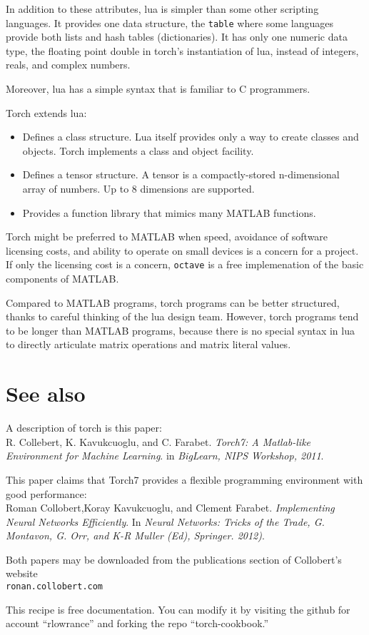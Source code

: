 \documentclass{article}
\let\code\texttt %
\begin{document}
In addition to these attributes, lua is simpler than some other
scripting languages. It provides one data structure, the \code{table}
where some languages provide both lists and hash tables (dictionaries).
It has only one numeric data type, the floating point double in torch's
instantiation of lua, instead of integers, reals, and complex numbers.

Moreover, lua has a simple syntax that is familiar to C programmers.

Torch extends lua:
\begin{itemize}
  \item Defines a class structure. Lua itself provides only a way to
    create classes and objects. Torch implements a class and object
    facility.
  \item Defines a tensor structure. A tensor is a compactly-stored
    n-dimensional array
    of numbers. Up to 8 dimensions are supported.
  \item Provides a function library that mimics many MATLAB functions. 
\end{itemize}


Torch might be preferred to MATLAB when speed, avoidance of software
licensing costs, and ability to operate on small devices is a concern
for a project. If only the licensing cost is a concern, \code{octave} is
a free implemenation of the basic components of MATLAB.

Compared to MATLAB programs, torch programs can be better structured,
thanks to careful thinking of the lua design team. However, torch
programs tend to be longer than MATLAB programs, because there is no
special syntax in lua to directly articulate matrix operations and
matrix literal values.




\section{See also}

A description of torch is this paper:\\
R. Collebert, K. Kavukcuoglu, and C. Farabet. \emph{Torch7: A
Matlab-like Environment for Machine Learning}. in \emph{BigLearn, NIPS
Workshop, 2011}.

This paper claims that Torch7 provides a flexible programming
environment with good performance:\\
Roman Collobert,Koray Kavukcuoglu, and Clement Farabet.
\emph{Implementing Neural Networks Efficiently}. In \emph{Neural
  Networks: Tricks of the Trade, G. Montavon, G. Orr, and K-R Muller
(Ed), Springer. 2012)}.

Both papers may be downloaded from the publications section of 
Collobert's website\\
\code{ronan.collobert.com}

This recipe is free documentation. You can modify it by visiting the
github for account ``rlowrance'' and forking the repo
``torch-cookbook.''
\end{document}
